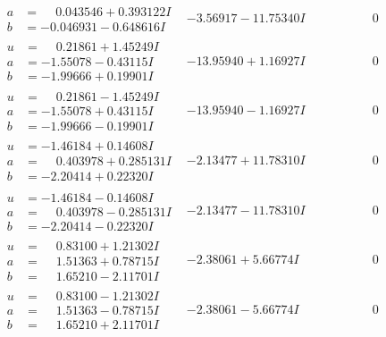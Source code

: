 \documentclass[1p]{elsarticle_modified}
\theoremstyle{definition}
\begin{document}
$$\begin{array}{c|c|c}
\begin{aligned}
a &= \phantom{-}0.043546 + 0.393122 I \\
b &= -0.046931 - 0.648616 I\end{aligned}
 & -3.56917 - 11.75340 I & \phantom{-0.000000 } 0 \\ \hline\begin{aligned}
u &= \phantom{-}0.21861 + 1.45249 I \\
a &= -1.55078 - 0.43115 I \\
b &= -1.99666 + 0.19901 I\end{aligned}
 & -13.95940 + 1.16927 I & \phantom{-0.000000 } 0 \\ \hline\begin{aligned}
u &= \phantom{-}0.21861 - 1.45249 I \\
a &= -1.55078 + 0.43115 I \\
b &= -1.99666 - 0.19901 I\end{aligned}
 & -13.95940 - 1.16927 I & \phantom{-0.000000 } 0 \\ \hline\begin{aligned}
u &= -1.46184 + 0.14608 I \\
a &= \phantom{-}0.403978 + 0.285131 I \\
b &= -2.20414 + 0.22320 I\end{aligned}
 & -2.13477 + 11.78310 I & \phantom{-0.000000 } 0 \\ \hline\begin{aligned}
u &= -1.46184 - 0.14608 I \\
a &= \phantom{-}0.403978 - 0.285131 I \\
b &= -2.20414 - 0.22320 I\end{aligned}
 & -2.13477 - 11.78310 I & \phantom{-0.000000 } 0 \\ \hline\begin{aligned}
u &= \phantom{-}0.83100 + 1.21302 I \\
a &= \phantom{-}1.51363 + 0.78715 I \\
b &= \phantom{-}1.65210 - 2.11701 I\end{aligned}
 & -2.38061 + 5.66774 I & \phantom{-0.000000 } 0 \\ \hline\begin{aligned}
u &= \phantom{-}0.83100 - 1.21302 I \\
a &= \phantom{-}1.51363 - 0.78715 I \\
b &= \phantom{-}1.65210 + 2.11701 I\end{aligned}
 & -2.38061 - 5.66774 I & \phantom{-0.000000 } 0 \\ \hline\begin{aligned}

\end{aligned}
\end{array}$$
\end{document}
